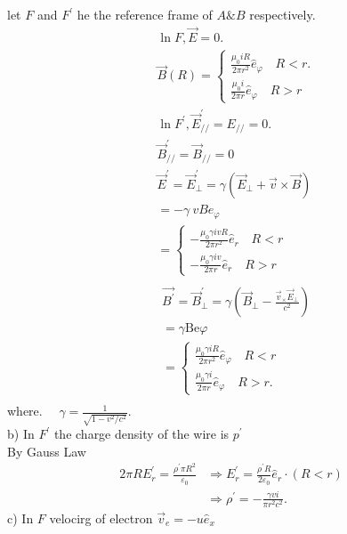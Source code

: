\documentclass{article}
\begin{document}
let $F$ and $F^{\prime}$ he the reference frame of $A \& B$ respectively.
$$
\begin{aligned}
& \ln F, \vec{E}=0 \text {. } \\
& \vec{B}(R)=\left\{\begin{array}{l}
\frac{\mu_0 i R}{2 \pi r^2} \hat{e}_{\varphi} \quad R<r . \\
\frac{\mu_0 i}{2 \pi r} \hat{e}_{\varphi} \quad R>r
\end{array}\right. \\
& \ln F^{\prime}, \vec{E}_{//}^{\prime}=E_{//}=0 . \\
& \vec{B}_{//}^{\prime}=\vec{B}_{//}=0 \\
& \vec{E}^{\prime}=\vec{E}_{\perp}^{\prime}=\gamma\left(\Vec{E}_{\perp}+\vec{v} \times \vec{B}\right) \\
& =-\gamma\ v B e_{\varphi} \\
& = \begin{cases}-\frac{\mu_0 \gamma i v R}{2 \pi r^2} \hat{e}_r \quad R<r \\
-\frac{\mu_0 \gamma i v}{2 \pi r} \hat{e}_r \quad R>r\end{cases} \\
&
\end{aligned}
$$
$$
\begin{aligned}
& \vec{B^{\prime}}=\vec{B}_{\perp}^{\prime}=\gamma\left(\vec{B}_{\perp}-\frac{\vec{v}_{\times} \vec{E}_{\perp}}{c^2}\right) \\
& =\gamma \mathrm{Be} \varphi \\
& =\left\{\begin{array}{l}
\frac{\mu_0 \gamma i R}{2 \pi r^2} \hat{e}_{\varphi} \quad R<r \\
\frac{\mu_0 \gamma i}{2 \pi r} \hat{e}_{\varphi} \quad R>r  .
\end{array}\right. \\
&
\end{aligned}
$$
where. $\quad \gamma=\frac{1}{\sqrt{1-v^2 / c^2}}$.\\
b) In $F^{\prime}$ the charge density of the wire is $p^{\prime}$\\
By Gauss Law
$$
\begin{aligned}
2 \pi R E_r^{\prime}=\frac{\rho^{\prime} \pi R^2}{\varepsilon_0} & \Rightarrow E_r^{\prime}=\frac{\rho^{\prime} R}{2 \varepsilon_0} \hat{e}_r \cdot(R<r) \\
& \Rightarrow \rho^{\prime}=-\frac{\gamma v i}{\pi r^2 c^2} .
\end{aligned}
$$
c) In $F$ velocirg of electron $\vec{v}_e=-u \hat{e}_x$ \\
\end{document}
